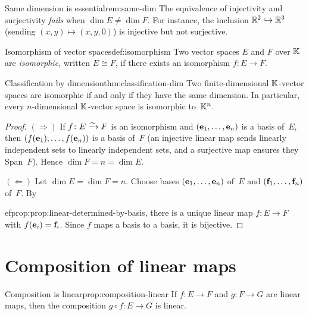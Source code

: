 \begin{remark}{Same dimension is essential}{rem:same-dim}
The equivalence of injectivity and surjectivity \emph{fails} when
$\dim E\neq\dim F$. For instance, the inclusion
${\mathbb{R}}^2\hookrightarrow{\mathbb{R}}^3$ (sending $(x,y)\mapsto(x,y,0)$) is
injective but not surjective.
\end{remark}

\begin{definition}{Isomorphism of vector spaces}{def:isomorphism}
Two vector spaces $E$ and $F$ over ${\mathbb{K}}$ are \emph{isomorphic},
written $E\cong F$, if there exists an isomorphism $f\colon E\to F$.
\end{definition}

\begin{theorem}{Classification by dimension}{thm:classification-dim}
Two finite-dimensional ${\mathbb{K}}$-vector spaces are isomorphic if and only
if they have the same dimension. In particular, every
$n$-dimensional ${\mathbb{K}}$-vector space is isomorphic to~${\mathbb{K}}^n$.
\end{theorem}

\begin{proof}
$(\Rightarrow)$\; If $f\colon E\xrightarrow{\sim} F$ is an isomorphism and
$(\mathbf{e}_{1},\ldots,\mathbf{e}_{n})$ is a basis of~$E$, then
$(f(\mathbf{e}_{1}),\ldots,f(\mathbf{e}_{n}))$ is a basis of~$F$
(an injective linear map sends linearly independent sets to linearly
independent sets, and a surjective map ensures they Span~$F$). Hence
$\dim F = n = \dim E$.

$(\Leftarrow)$\; Let $\dim E = \dim F = n$. Choose bases
$(\mathbf{e}_{1},\ldots,\mathbf{e}_{n})$ of~$E$ and
$(\mathbf{f}_{1},\ldots,\mathbf{f}_{n})$ of~$F$. By

ef{prop:prop:linear-determined-by-basis}, there is a unique linear map
$f\colon E\to F$ with $f(\mathbf{e}_{i}) = \mathbf{f}_{i}$. Since $f$ maps
a basis to a basis, it is bijective.
\end{proof}


\section{Composition of linear maps}\label{sec:composition}

\begin{proposition}{Composition is linear}{prop:composition-linear}
If $f\colon E\to F$ and $g\colon F\to G$ are linear maps, then the
composition $g\circ f\colon E\to G$ is linear.
\end{proposition}

